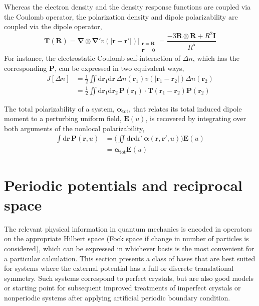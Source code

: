 Whereas the electron density and the density response functions are coupled via the Coulomb operator, the polarization density and dipole polarizability are coupled via the dipole operator,
\begin{equation}
  \mathbf T(\mathbf R)=\boldsymbol\nabla\otimes\boldsymbol\nabla'v(|\mathbf r-\mathbf r'|)\Big|_{\substack{\mathbf r=\mathbf R\\\mathbf r'=\mathbf 0}}=\frac{-3\mathbf R\otimes\mathbf R+R^2\mathbf I}{R^5}
  \label{eq:dipole-op}
\end{equation}
For instance, the electrostatic Coulomb self-interaction of $\Delta n$, which has the corresponding $\mathbf P$, can be expressed in two equivalent ways,
\begin{equation}
\begin{aligned}
  J[\Delta n]&=\frac12\iint\mathrm d\mathbf r_1\mathrm d\mathbf r\,\Delta n(\mathbf r_1)v(|\mathbf r_1-\mathbf r_2|)\Delta n(\mathbf r_2) \\
  &=\frac12\iint\mathrm d\mathbf r_1\mathrm d\mathbf r_2\,\mathbf P(\mathbf r_1)\cdot\mathbf T(\mathbf r_1-\mathbf r_2)\mathbf P(\mathbf r_2)
\end{aligned}
\label{eq:elstat-energy}
\end{equation}

The total polarizability of a system, $\boldsymbol\alpha_\text{tot}$, that relates its total induced dipole moment to a perturbing uniform field, $\mathbf E(u)$, is recovered by integrating over both arguments of the nonlocal polarizability,
\begin{equation}
\begin{aligned}
  \textstyle\int\mathrm d\mathbf r\,\mathbf P(\mathbf r,u)&=\Big(\textstyle\iint\mathrm d\mathbf r\mathrm d\mathrm r'\,\boldsymbol\alpha(\mathbf r,\mathbf r',u)\!\Big)\mathbf E(u) \\
  &=\boldsymbol\alpha_\text{tot}\mathbf E(u)
\end{aligned}
\end{equation}

\section{Periodic potentials and reciprocal space}

The relevant physical information in quantum mechanics is encoded in operators on the appropriate Hilbert space (Fock space if change in number of particles is considered), which can be expressed in whichever basis is the most convenient for a particular calculation.
This section presents a class of bases that are best suited for systems where the external potential has a full or discrete translational symmetry.
Such systems correspond to perfect crystals, but are also good models or starting point for subsequent improved treatments of imperfect crystals or nonperiodic systems after applying artificial periodic boundary condition.

